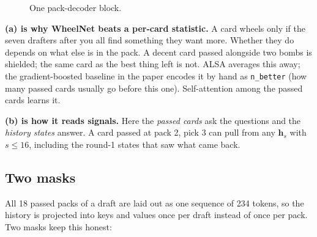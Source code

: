 \documentclass[11pt,letterpaper]{article}
\newcommand{\code}[1]{\texttt{\small #1}}
\begin{document}
\begin{figure}[!htbp]
\centering
{}
\caption{One pack-decoder block.}
\label{fig:block}
\end{figure}

\textbf{(a) is why WheelNet beats a per-card statistic.} A card wheels only if the seven drafters after you
all find something they want more. Whether they do depends on what else is in the pack. A decent card passed
alongside two bombs is shielded; the same card as the best thing left is not. ALSA averages this away; the
gradient-boosted baseline in the paper encodes it by hand as \code{n\_better} (how many passed cards usually
go before this one). Self-attention among the passed cards learns it.

\textbf{(b) is how it reads signals.} Here the \emph{passed cards} ask the questions and the \emph{history
states} answer. A card passed at pack 2, pick 3 can pull from any $\mathbf{h}_s$ with $s\le16$, including
the round-1 states that saw what came back.

\subsection{Two masks}

All 18 passed packs of a draft are laid out as one sequence of 234 tokens, so the history is projected into
keys and values once per draft instead of once per pack. Two masks keep this honest:
\end{document}
